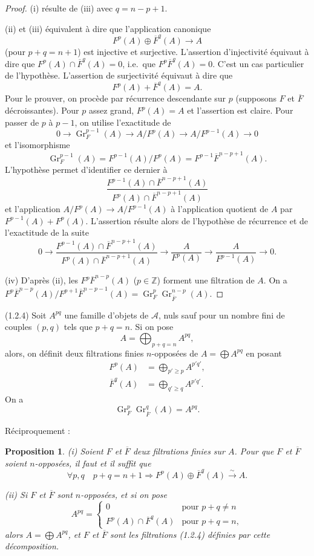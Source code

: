 \documentclass[11pt,a4paper]{amsart}
\theoremstyle{plain}
\newtheorem{proposition}[theorem]{Proposition}
\theoremstyle{definition}
\theoremstyle{remark}
\DeclareMathOperator{\Gr}{Gr}
\newcommand{\sA}{\mathscr{A}}
\newcommand{\bZ}{\mathbb{Z}}
\numberwithin{equation}{subsection}
\begin{document}
\begin{proof}
(i) r\'esulte de (iii) avec $q = n-p+1$.

(ii) et (iii) \'equivalent \`a dire que l'application canonique
\[
F^p(A) \oplus \overline{F}^q(A) \to A
\]
(pour $p+q = n+1$) est injective et surjective. L'assertion d'injectivit\'e \'equivaut
\`a dire que $F^p(A) \cap \overline{F}^q(A) = 0$, i.e.~que $F^p \overline{F}^q(A) = 0$. C'est un
cas particulier de l'hypoth\`ese. L'assertion de surjectivit\'e \'equivaut \`a dire que
\[
F^p(A) + \overline{F}^q(A) = A.
\]
Pour le prouver, on proc\`ede par r\'ecurrence descendante sur $p$ (supposons $F$ et $\overline{F}$
d\'ecroissantes). Pour $p$ assez grand, $F^p(A) = A$ et l'assertion est claire. Pour passer
de $p$ \`a $p-1$, on utilise l'exactitude de
\[
0 \to \Gr_F^{p-1}(A) \to A/F^p(A) \to A/F^{p-1}(A) \to 0
\]
et l'isomorphisme
\[
\Gr_F^{p-1}(A) = F^{p-1}(A)/F^p(A) = F^{p-1} \overline{F}^{n-p+1}(A).
\]
L'hypoth\`ese permet d'identifier ce dernier \`a
\[
\frac{F^{p-1}(A) \cap \overline{F}^{n-p+1}(A)}{F^p(A) \cap \overline{F}^{n-p+1}(A)}
\]
et l'application $A/F^p(A) \to A/F^{p-1}(A)$ \`a l'application quotient de $A$ par $F^{p-1}(A) + F^p(A)$.
L'assertion r\'esulte alors de l'hypoth\`ese de r\'ecurrence et de l'exactitude de la suite
\[
0 \to \frac{F^{p-1}(A) \cap \overline{F}^{n-p+1}(A)}{F^p(A) \cap \overline{F}^{n-p+1}(A)} \to \frac{A}{F^p(A)} \to \frac{A}{F^{p-1}(A)} \to 0.
\]

(iv) D'apr\`es (ii), les $F^p \overline{F}^{n-p}(A)$ ($p \in \bZ$) forment une filtration de $A$.
On a $F^p \overline{F}^{n-p}(A)/F^{p+1} \overline{F}^{n-p-1}(A) = \Gr_F^p \Gr_{\overline{F}}^{n-p}(A)$.
\end{proof}

(1.2.4) Soit $A^{pq}$ une famille d'objets de $\sA$, nuls sauf pour un nombre fini de couples
$(p,q)$ tels que $p+q = n$. Si on pose
\[
A = \bigoplus_{p+q=n} A^{pq},
\]
alors, on d\'efinit deux filtrations finies $n$-oppos\'ees de $A = \bigoplus A^{pq}$ en posant
\begin{align}
F^p(A) &= \bigoplus_{p' \geqslant p} A^{p' q'}, \\
\overline{F}^q(A) &= \bigoplus_{q' \geqslant q} A^{p' q'}.
\end{align}
On a
\[
\Gr_F^p \Gr_{\overline{F}}^q(A) = A^{pq}.
\]

R\'eciproquement :

\begin{proposition}\label{prop:1.2.5}
\textup{(i)} Soient $F$ et $\overline{F}$ deux filtrations finies sur $A$. Pour que $F$ et $\overline{F}$ soient
$n$-oppos\'ees, il faut et il suffit que
\[
\forall p, q \quad p+q = n+1 \Rightarrow F^p(A) \oplus \overline{F}^q(A) \xrightarrow{\sim} A.
\]

\textup{(ii)} Si $F$ et $\overline{F}$ sont $n$-oppos\'ees, et si on pose
\[
A^{pq} = \begin{cases}
0 & \text{pour } p+q \neq n \\
F^p(A) \cap \overline{F}^q(A) & \text{pour } p+q = n,
\end{cases}
\]
alors $A = \bigoplus A^{pq}$, et $F$ et $\overline{F}$ sont les filtrations (1.2.4) d\'efinies par
cette d\'ecomposition.
\end{proposition}
\end{document}
